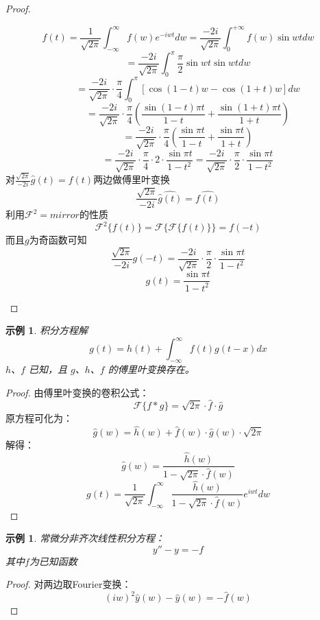 \documentclass[linespread=1.5,openany]{book}%
\theoremstyle{plain}
\newtheorem{example}[theorem]{示例}
\begin{document}
{{{\begin{proof}
\begin{itemize}
							\[
							f(t)=\frac{1}{\sqrt{2\pi}}\int_{-\infty}^{\infty} f(w)e^{-iwt}dw=\frac{-2i}{\sqrt{2\pi}}\int_0^{+\infty}f(w)\sin w t dw \]
							\[\qquad=\frac{-2i}{\sqrt{2\pi}}\int_0^\pi \frac{\pi}{2}\sin w t\sin w t dw \]
							\[\qquad=\frac{-2i}{\sqrt{2\pi}}\cdot\frac{\pi}{4}\int_0^\pi [\cos(1-t)w-\cos(1+t)w] dw \]
							\[\qquad=\frac{-2i}{\sqrt{2\pi}}\cdot\frac{\pi}{4}\left( \frac{\sin(1-t)\pi t}{1-t}+\frac{\sin(1+t)\pi t}{1+t} \right) \]
							\[\qquad=\frac{-2i}{\sqrt{2\pi}}\cdot\frac{\pi}{4}\left( \frac{\sin \pi t}{1-t}+\frac{\sin \pi t}{1+t} \right) \]
							\[\qquad=\frac{-2i}{\sqrt{2\pi}}\cdot\frac{\pi}{4}\cdot 2\cdot\frac{\sin\pi t}{1-t^2}=\frac{-2i}{\sqrt{2\pi}}\cdot\frac{\pi}{2}\cdot\frac{\sin \pi t}{1-t^2} \]
							对$\frac{\sqrt{2\pi}}{-2i}\hat{g}(t) = f(t)$两边做傅里叶变换
							\[
							\frac{\sqrt{2\pi}}{-2i} \widehat{\hat{g}(t)} =\hat{f(t)}
							\]
							利用$\mathcal{F}^2=mirror$的性质\[
							\mathcal{F}^{2}\{f(t)\} = \mathcal{F}\{\mathcal{F}\{f(t)\}\} = f(-t)\]
							而且\(g\)为奇函数可知
							\[
							\frac{\sqrt{2\pi}}{-2i}g(-t) = \frac{-2i}{\sqrt{2\pi}} \cdot \frac{\pi}{2} \cdot \frac{\sin \pi t}{1 - t^2}
							\]
							\[	g(t) = \frac{\sin\pi t}{1 - t^2}\]	\end{itemize}
					\end{proof}
					\begin{example}
						积分方程解
						\[	g(t) = h(t) + \int_{-\infty}^{\infty} f(t) g(t - x) dx\]
						\( h \)、\( f \) 已知，且 \( g \)、\( h \)、\( f \) 的傅里叶变换存在。	\end{example}
					\begin{proof}
						由傅里叶变换的卷积公式：
						\[	\mathcal{F}\{f * g\} = \sqrt{2\pi} \cdot \hat{f} \cdot \hat{g}
						\]
						原方程可化为：
						\[\hat{g}(w) = \hat{h}(w) + \hat{f}(w) \cdot \hat{g}(w) \cdot \sqrt{2\pi}\]	
						解得：
						\[\hat{g}(w) = \frac{\hat{h}(w)}{1 - \sqrt{2\pi} \cdot \hat{f}(w)}\]
						\[
						g(t) = \frac{1}{\sqrt{2\pi}} \int_{-\infty}^{\infty} \frac{\hat{h}(w)}{1 - \sqrt{2\pi} \cdot \hat{f}(w)} e^{iwt} dw
						\]
					\end{proof}
					\begin{example}
						常微分非齐次线性积分方程：
						\begin{equation}
							y'' - y = -f
						\end{equation}
						其中$ f$为已知函数\end{example}
					\begin{proof}
						对两边取Fourier变换：
						\begin{equation}
							(iw)^2 \hat{y}(w) - \hat{y}(w) = -\hat{f}(w)
						\end{equation}
						

\end{proof}}}}
\end{document}
